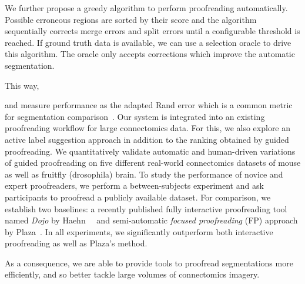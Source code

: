 We further propose a greedy algorithm to perform proofreading automatically. Possible erroneous regions are sorted by their score and the algorithm sequentially corrects merge errors and split errors until a configurable threshold is reached. If ground truth data is available, we can use a selection oracle to drive this algorithm. The oracle only accepts corrections which improve the automatic segmentation. 

This way, 


 and measure performance as the adapted Rand error which is a common metric for segmentation comparison~\cite{RAND}. 
Our system is integrated into an existing proofreading workflow for large connectomics data. For this, we also explore an active label suggestion approach in addition to the ranking obtained by guided proofreading. We quantitatively validate automatic and human-driven variations of guided proofreading on five different real-world connectomics datasets of mouse as well as fruitfly (drosophila) brain. To study the performance of novice and expert proofreaders, we perform a between-subjects experiment and ask participants to proofread a publicly available dataset. For comparison, we establish two baselines: a recently published fully interactive proofreading tool named \textit{Dojo} by Haehn~\etal~\cite{haehn_dojo_2014} and semi-automatic \textit{focused proofreading} (FP) approach by Plaza~\cite{focused_proofreading}. In all experiments, we significantly outperform both interactive proofreading as well as Plaza's method. 



As a consequence, we are able to provide tools to proofread segmentations more efficiently, and so better tackle large volumes of connectomics imagery.

